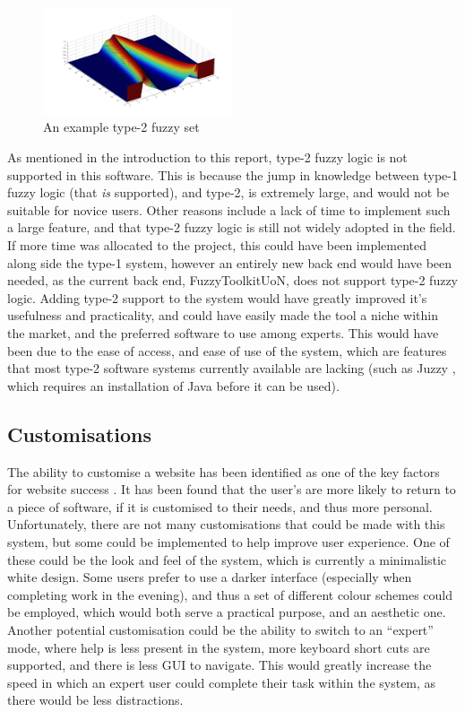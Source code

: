 \begin{figure}[ht!]
	\begin{center}
		\includegraphics[width=0.5\textwidth]{images/type2set}
	\end{center}
	\vspace{-4mm}
	\caption{An example type-2 fuzzy set}
	\label{fig:fw-type2}
	\vspace{-1mm}
\end{figure}
\noindent
As mentioned in the introduction to this report, type-2 fuzzy logic is not supported in this software. This is because the jump in knowledge between type-1 fuzzy logic (that \emph{is} supported), and type-2, is extremely large, and would not be suitable for novice users. Other reasons include a lack of time to implement such a large feature, and that type-2 fuzzy logic is still not widely adopted in the field. If more time was allocated to the project, this could have been implemented along side the type-1 system, however an entirely new back end would have been needed, as the current back end, FuzzyToolkitUoN, does not support type-2 fuzzy logic. Adding type-2 support to the system would have greatly improved it's usefulness and practicality, and could have easily made the tool a niche within the market, and the preferred software to use among experts. This would have been due to the ease of access, and ease of use of the system, which are  features that most type-2 software systems currently available are lacking (such as Juzzy \cite{wagner2013juzzy}, which requires an installation of Java before it can be used).

\subsection{Customisations}
The ability to customise a website has been identified as one of the key factors for website success \cite{fan2010factors}. It has been found that the user's are more likely to return to a piece of software, if it is customised to their needs, and thus more personal. Unfortunately, there are not many customisations that could be made with this system, but some could be implemented to help improve user experience. One of these could be the look and feel of the system, which is currently a minimalistic white design. Some users prefer to use a darker interface (especially when completing work in the evening), and thus a set of different colour schemes could be employed, which would both serve a practical purpose, and an aesthetic one. Another potential customisation could be the ability to switch to an ``expert'' mode, where help is less present in the system, more keyboard short cuts are supported, and there is less GUI to navigate. This would greatly increase the speed in which an expert user could complete their task within the system, as there would be less distractions.